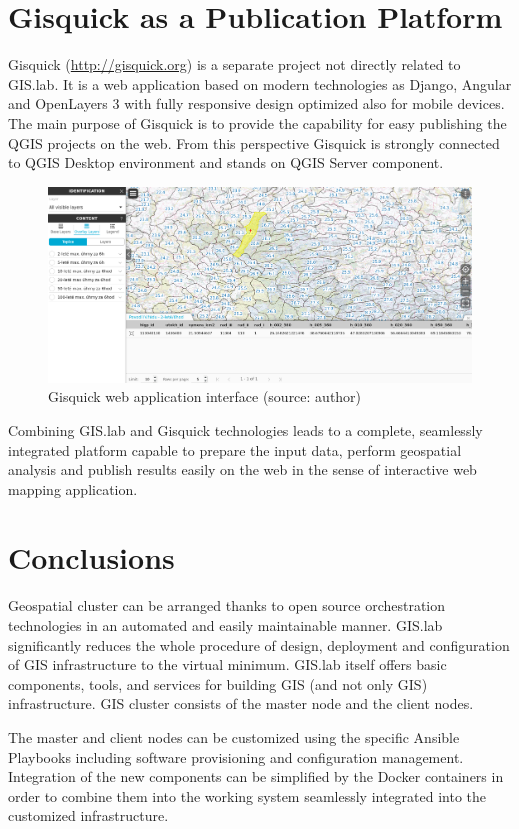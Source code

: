 \documentclass{tudelftposter}
\begin{document}
\section{Gisquick as a Publication Platform}

Gisquick (\url{http://gisquick.org}) is a separate project not
directly related to GIS.lab. It is a web application based on modern
technologies as Django, Angular and OpenLayers 3 with fully responsive
design optimized also for mobile devices. The main purpose of Gisquick
is to provide the capability for easy publishing the QGIS projects on
the web. From this perspective Gisquick is strongly connected to QGIS
Desktop environment and stands on QGIS Server component.

\begin{figure}[ht!]
\begin{center}
  \includegraphics[width=0.9\columnwidth]{../paper/figures/gisquick-identify.png}
  \caption{Gisquick web application interface
    (source: author)}
\label{fig:gislab_infrastructure}
\end{center}
\end{figure}

Combining GIS.lab and Gisquick technologies leads to a complete, seamlessly
integrated platform capable to prepare the input data, perform geospatial
analysis and publish results easily on the web in the sense of interactive
web mapping application.

\section{Conclusions}

Geospatial cluster can be arranged thanks to open source orchestration
technologies in an automated and easily maintainable manner. GIS.lab
significantly reduces the whole procedure of design, deployment and
configuration of GIS infrastructure to the virtual minimum. GIS.lab
itself offers basic components, tools, and services for building GIS
(and not only GIS) infrastructure. GIS cluster consists of the master
node and the client nodes.

The master and client nodes can be customized using the specific
Ansible Playbooks including software provisioning and configuration
management. Integration of the new components can be simplified by the
Docker containers in order to combine them into the working system
seamlessly integrated into the customized infrastructure.
\end{document}
